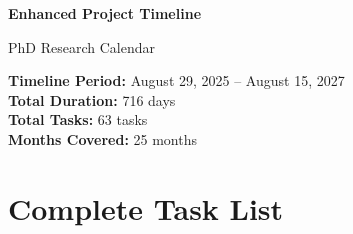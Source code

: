 \documentclass[landscape,a4paper]{article}
\begin{document}
\begin{titlepage}
\centering
\vspace*{1cm}

{\LARGE\textbf{Enhanced Project Timeline}}

\vspace{0.5cm}
{\large PhD Research Calendar}

\vspace{1cm}

\begin{minipage}{0.9\textwidth}
\centering
\textbf{Timeline Period:} August 29, 2025 -- August 15, 2027\\
\textbf{Total Duration:} 716 days\\
\textbf{Total Tasks:} 63 tasks\\
\textbf{Months Covered:} 25 months
\end{minipage}

\vfill

\end{titlepage}
\newpage

\section{Complete Task List}
\vspace{0.5cm}
\end{document}
